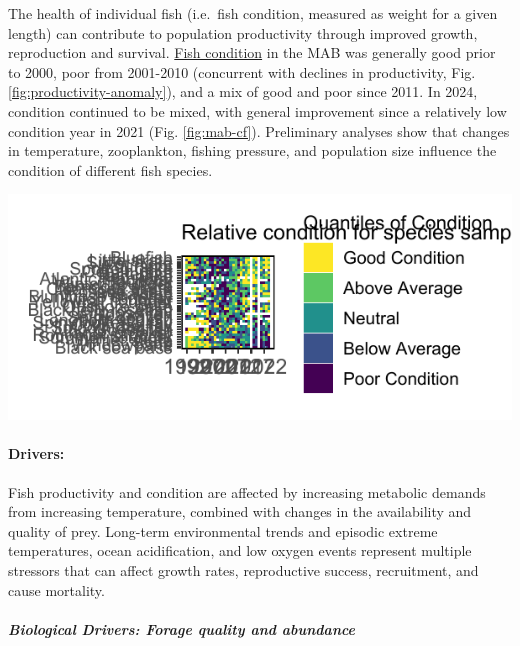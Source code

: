 \documentclass[
  10pt,
]{article}
\let\origfigure\figure
\let\endorigfigure\endfigure
\renewenvironment{figure}[1][2] {
    \expandafter\origfigure\expandafter[H]
} {
    \endorigfigure
}
\begin{document}
The health of individual fish (i.e.~fish condition, measured as weight for a given length) can contribute to population productivity through improved growth, reproduction and survival. \href{https://noaa-edab.github.io/catalog/condition.html}{Fish condition} in the MAB was generally good prior to 2000, poor from 2001-2010 (concurrent with declines in productivity, Fig. \ref{fig:productivity-anomaly}), and a mix of good and poor since 2011. In 2024, condition continued to be mixed, with general improvement since a relatively low condition year in 2021 (Fig. \ref{fig:mab-cf}). Preliminary analyses show that changes in temperature, zooplankton, fishing pressure, and population size influence the condition of different fish species.

\begin{figure}

{\centering \includegraphics{midatlantic_files/figure-latex/mab-cf-1} 

}

\caption{Condition factor for fish species in the MAB based on fall NEFSC bottom trawl survey data. MAB data are missing for 2017 due to survey delays, and no survey was conducted in 2020.}\label{fig:mab-cf}
\end{figure}

\paragraph{Drivers:}\label{drivers-2}

Fish productivity and condition are affected by increasing metabolic demands from increasing temperature, combined with changes in the availability and quality of prey. Long-term environmental trends and episodic extreme temperatures, ocean acidification, and low oxygen events represent multiple stressors that can affect growth rates, reproductive success, recruitment, and cause mortality.

\subparagraph{Biological Drivers: Forage quality and abundance}\label{biological-drivers-forage-quality-and-abundance}
\end{document}

